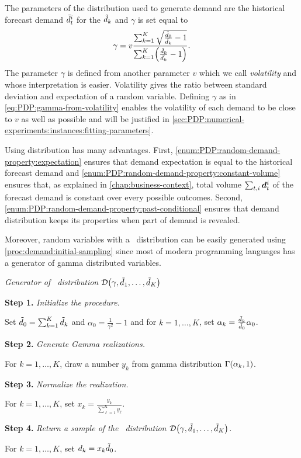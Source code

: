 The parameters of the \distrib distribution used to generate demand are the historical forecast demand $\bar{d}_t^i$ for the $\tilde{d}_k$ and $\gamma$ is set equal to
\begin{equation}\label{eq:PDP:gamma-from-volatility}
  \gamma
  =
  v\frac
  {\sum_{k=1}^K\sqrt{\frac{\tilde{\demand}_0}{\bar{\demand_k}}-1}}
  {\sum_{k=1}^K\bracket{\frac{\tilde{\demand}_0}{\bar{\demand_k}}-1}}.
\end{equation}
The parameter $\gamma$ is defined from another parameter $v$ which we call \emph{volatility} and whose interpretation is easier.
Volatility gives the ratio between standard deviation and expectation of a random variable.
Defining $\gamma$ as in \cref{eq:PDP:gamma-from-volatility} enables the volatility of each demand to be close to $v$ as well as possible and will be justified in \cref{sec:PDP:numerical-experiments:instances:fitting-parameters}.


Using \distrib distribution has many advantages.
First, \cref{enum:PDP:random-demand-property:expectation} ensures that demand expectation is equal to the historical forecast demand and \cref{enum:PDP:random-demand-property:constant-volume} ensures that, as explained in \cref{chap:business-context}, total volume $\sum_{t,i}\va\demand_t^i$ of the forecast demand is constant over every possible outcomes.
Second, \cref{enum:PDP:random-demand-property:past-conditional} ensures that demand distribution keeps its properties when part of demand is revealed.


Moreover, random variables with a \distrib\ distribution can be easily generated using \cref{proc:demand:initial-sampling} since most of modern programming languages has a generator of gamma distributed variables.


\begin{proc}\label{proc:demand:initial-sampling}
\emph{Generator of \distrib\ distribution $\cD\bracket{\gamma,\tilde{\demand}_1,\ldots,\tilde{\demand}_K}$}

\textbf{Step 1.} \emph{Initialize the procedure.}

Set $\tilde{d}_0 = \sum_{k=1}^K\tilde{d}_k$ and $\alpha_0 = \frac{1}{\gamma^2}-1$ and for $k=1,\ldots,K$, set $\alpha_k=\frac{\tilde{d}_k}{\tilde{d}_0}\alpha_0$.

\textbf{Step 2.} \emph{Generate Gamma realizations.}

For $k=1,\ldots,K$, draw a number $y_k$ from gamma distribution $\Gamma\bracket{\alpha_k,1}$.

\textbf{Step 3.} \emph{Normalize the realization.}

For $k=1,\ldots,K$, set $x_k=\frac{y_k}{\sum_{\ell=1}^K y_{\ell}}$.

\textbf{Step 4.} \emph{Return a sample of the \distrib\ distribution $\cD\bracket{\gamma,\tilde{\demand}_1,\ldots,\tilde{\demand}_K}$.}

For $k=1,\ldots,K$, set $d_k = x_k \tilde{d}_0$.
\end{proc}


